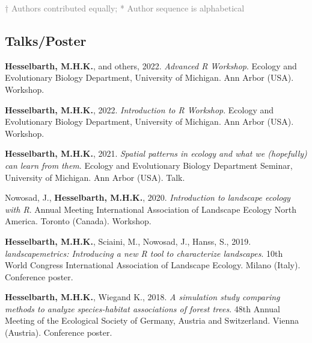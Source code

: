 \documentclass[hidelinks]{report}
\begin{document}
\textcolor{grey}{\footnotesize{† Authors contributed equally; * Author sequence is alphabetical}}






\subsection*{Talks/Poster}

\begin{hangparas}{7.5mm}{1}

\textbf{Hesselbarth, M.H.K.}, and others, 2022. \textit{Advanced R Workshop}. Ecology and Evolutionary Biology Department, University of Michigan. Ann Arbor (USA). Workshop.

\textbf{Hesselbarth, M.H.K.}, 2022. \textit{Introduction to R Workshop}. Ecology and Evolutionary Biology Department, University of Michigan. Ann Arbor (USA). Workshop.

\textbf{Hesselbarth, M.H.K.}, 2021. \textit{Spatial patterns in ecology and what we (hopefully) can learn from them}. Ecology and Evolutionary Biology Department Seminar, University of Michigan. Ann Arbor (USA). Talk.

Nowosad, J., \textbf{Hesselbarth, M.H.K.}, 2020. \textit{Introduction to landscape ecology with R}. Annual Meeting International Association of Landscape Ecology North America. Toronto (Canada). Workshop.

\textbf{Hesselbarth, M.H.K.}, Sciaini, M., Nowosad, J., Hanss, S., 2019. \textit{landscapemetrics: Introducing a new R tool to characterize landscapes}. 10th World Congress International Association of Landscape Ecology. Milano (Italy). Conference poster.

\textbf{Hesselbarth, M.H.K.}, Wiegand K., 2018. \textit{A simulation study comparing methods to analyze species-habitat associations of forest trees}. 48th Annual Meeting of the Ecological Society of Germany, Austria and Switzerland. Vienna (Austria). Conference poster.

\end{hangparas}
\end{document}
